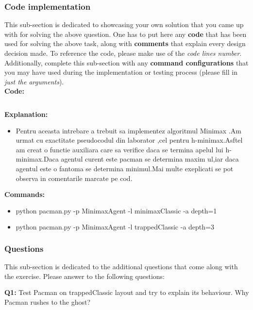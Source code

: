 \subsubsection{Code implementation}
This sub-section is dedicated to showcasing your own solution that you came up with for solving the above question. One has to put here any \textbf{code} that has been used for solving the above task, along with \textbf{comments} that explain every design decision made. To reference the code, please make use of the \textit{code lines number}. Additionally, complete this sub-section with any \textbf{command configurations} that you may have used during the implementation or testing process (please fill in \textit{just the arguments}). \\

\textbf{Code:}

\inputminted[linenos]{python}{code/09_h_minimax.py}


\textbf{Explanation:}
\begin{itemize}
    \setlength\itemsep{0em}
    \item Pentru aceasta intrebare a trebuit sa implementez algoritmul Minimax .Am urmat cu exactitate pseudocodul din laborator ,cel pentru h-minimax.Asftel am creat o functie auxiliara care sa verifice daca se termina apelul lui h-minimax.Daca agentul curent este pacman  se determina maxim ul,iar daca agentul este o fantoma se determina minimul.Mai multe exeplicati se pot observa in comentarile marcate pe cod.

\end{itemize}


\textbf{Commands:}
\begin{itemize}
    \setlength\itemsep{0em}
   \item  python pacman.py -p MinimaxAgent -l minimaxClassic -a depth=1
\item python pacman.py -p MinimaxAgent -l trappedClassic -a depth=3
        
\end{itemize}

\subsubsection{Questions}
This sub-section is dedicated to the additional questions that come along with the exercise. Please answer to the following questions:\newline


\textbf{Q1:} Test Pacman on trappedClassic layout and try to explain its behaviour. Why Pacman rushes to the ghost?

